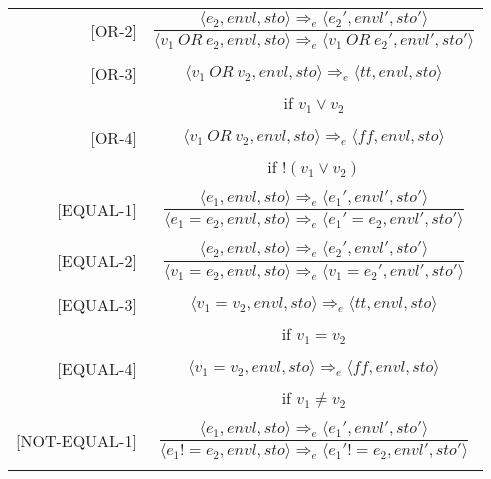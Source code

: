 \begin{longtable}[c] { r c }
  [OR-2] & \( 
    \dfrac { \langle e_2, envl, sto \rangle \Rightarrow_e \langle e_2', envl', sto' \rangle }
      { \langle v_1 \ OR \ e_2, envl, sto \rangle \Rightarrow_e \langle v_1 \ OR \ e_2', envl', sto' \rangle } \)
  \\
  & \\

  [OR-3] & \( 
    \langle v_1 \ OR \ v_2, envl, sto \rangle \Rightarrow_e \langle tt, envl, sto \rangle \)
  \\
  & if \( v_1 \lor v_2 \) \\
  & \\

  [OR-4] & \( 
    \langle v_1 \ OR \ v_2, envl, sto \rangle \Rightarrow_e \langle ff, envl, sto \rangle \)
  \\
  & if \( !(v_1 \lor  v_2) \) \\
  & \\

  [EQUAL-1] & \( 
    \dfrac { \langle e_1, envl, sto \rangle \Rightarrow_e \langle e_1', envl', sto' \rangle }
      { \langle e_1 = e_2, envl, sto \rangle \Rightarrow_e \langle e_1' = e_2, envl', sto' \rangle } \)
  \\
  & \\

  [EQUAL-2] & \( 
    \dfrac { \langle e_2, envl, sto \rangle \Rightarrow_e \langle e_2', envl', sto' \rangle }
      { \langle v_1 = e_2, envl, sto \rangle \Rightarrow_e \langle v_1 = e_2', envl', sto' \rangle } \)
  \\
  & \\

  [EQUAL-3] & \( 
    \langle v_1 = v_2, envl, sto \rangle \Rightarrow_e \langle tt, envl, sto \rangle \)
  \\
  & if \( v_1 = v_2 \) \\
  & \\

  [EQUAL-4] & \( 
    \langle v_1 = v_2, envl, sto \rangle \Rightarrow_e \langle ff, envl, sto \rangle \)
  \\
  & if \( v_1 \neq v_2 \) \\
  & \\

  [NOT-EQUAL-1] & \( 
    \dfrac { \langle e_1, envl, sto \rangle \Rightarrow_e \langle e_1', envl', sto' \rangle }
      { \langle e_1 != e_2, envl, sto \rangle \Rightarrow_e \langle e_1' != e_2, envl', sto' \rangle } \)
  \\
  & \\


\end{longtable}
